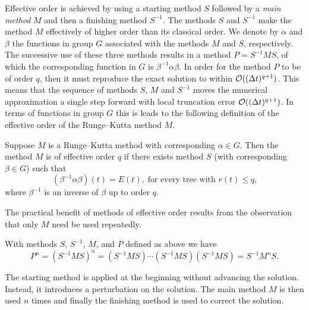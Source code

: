 Effective order is achieved by using a starting method $S$ followed by
a \emph{main method} $M$ %
and then a finishing method $S^{-1}$.
The methods $S$ and $S^{-1}$ make the method $M$ effectively of higher order than its classical order.
We denote by $\alpha$ and $\beta$ the functions in group $G$ associated with the methods $M$ and $S$, respectively.
The successive use of these three methods results in a method $P = S^{-1}MS$, of which the corresponding function in $G$ is $\beta^{-1}\alpha\beta$.
In order for the method $P$ to be of order $q$, then it must reproduce the exact solution to within $\mathcal{O}((\Delta t)^{q+1})$.
This means that the sequence of methods \( S \), \( M \) and \( S^{-1} \) moves the numerical approximation a single step forward with local truncation error \( \mathcal{O}((\Delta t)^{q+1}) \).
In terms of functions in group $G$ this is leads to the following definition of the effective order of the Runge--Kutta method $M$.
\begin{definition}\cite{Butcher1987_book}\label{def:Effective_order}
  Suppose $M$ is a Runge--Kutta method with corresponding $\alpha \in G$.
  Then the method $M$ is of effective order $q$ if there exists method
  $S$ (with corresponding $\beta \in G$) such that
	\begin{equation}\label{eq:Effective_order_1}
		(\beta^{-1}\alpha\beta)(t) = E(t), \; \text{for every tree with $r(t) \leq q$,}
	\end{equation}
        where $\beta^{-1}$ is an inverse of $\beta$ up to order $q$.
\end{definition}
The practical benefit of methods of effective order results from the
observation that only $M$ need be used repeatedly.
\begin{result}
  With methods $S$, $S^{-1}$, $M$, and $P$ defined as above we have
  $$P^n = (S^{-1}MS)^n = (S^{-1}MS) \cdots (S^{-1}MS) (S^{-1}MS)
        = S^{-1} M^n S.$$
\end{result}


The starting method is applied at the beginning without advancing the
solution.
Instead, it introduces a perturbation on the solution.
The main method \( M \) is then used \( n \) times and finally the
finishing method is used to correct the solution.



